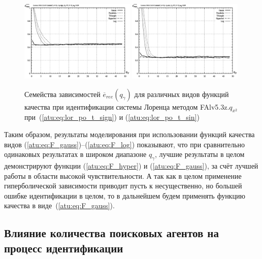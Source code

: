 \begin{figure}[h!]
  \centerline{
    \includegraphics[width=0.49\textwidth]{p/cha/lor/FAlv5.3z/f_type/lor_FAlv5_3z_qx2_Ft-p_qg_e_all_sign_ree.png}
    \hfill
    \includegraphics[width=0.49\textwidth]{p/cha/lor/FAlv5.3z/f_type/lor_FAlv5_3z_qx2_Ft-p_qg_e_all_sin_ree.png}
  }
  \caption{Семейства зависимостей $\overline{e}_{ree}(q_\gamma)$ для различных видов функций качества при идентификации системы Лоренца методом FAlv5.3z.$q_{x^2}$
   при~(\ref{atu:eq:lor_po_t_sign}) и (\ref{atu:eq:lor_po_t_sin})}
  \label{atu:f:lor_ftype_ree}
\end{figure}

Таким образом, результаты моделирования при использовании
функций качества видов
(\ref{atu:eq:F_gauss})--(\ref{atu:eq:F_log}) показывают,
что при сравнительно одинаковых результатах в широком
диапазоне $q_\gamma$, лучшие результаты в целом
демонстрируют функции (\ref{atu:eq:F_hyper}) и (\ref{atu:eq:F_gauss}),
за счёт лучшей работы в области высокой чувствительности.
А так как в целом применение гиперболической зависимости
приводит пусть к несущественно, но большей ошибке идентификации в целом,
то в дальнейшем будем применять функцию качества в виде~(\ref{atu:eq:F_gauss}).


\subsection{Влияние количества поисковых агентов на процесс идентификации}


